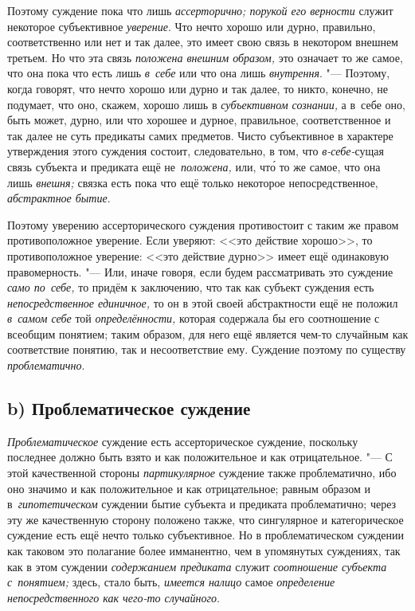 Поэтому суждение пока что лишь {\em ассерторично; порукой его верности}
служит некоторое субъективное {\em уверение}. Что нечто
хорошо или дурно, правильно, соответственно или нет и так далее, это имеет
свою связь в некотором внешнем третьем. Но что эта связь
{\em положена внешним образом,}
это означает то же самое, что она пока что есть лишь
{\em в~себе} или что она лишь {\em внутрення}. "---
Поэтому, когда говорят, что нечто хорошо или дурно и так
далее, то никто, конечно, не подумает, что оно, скажем, хорошо лишь в
{\em субъективном сознании,}
а в~себе оно, быть может, дурно, или что хорошее и дурное,
правильное, соответственное и так далее не суть предикаты самих предметов.
Чисто субъективное в характере утверждения этого суждения состоит,
следовательно, в том, что {\em в-себе-}сущая связь субъекта и предиката ещё
не~{\em положена,} или, чт\'{о} то же самое, что она лишь {\em внешня;} связка
есть пока что ещё только некоторое непосредственное, {\em абстрактное бытие}.

Поэтому уверению ассерторического суждения противостоит с таким
же правом противоположное уверение. Если уверяют: <<это действие
хорошо>>, то противоположное уверение: <<это действие дурно>> имеет ещё
одинаковую правомерность. "--- Или, иначе говоря, если будем
рассматривать это суждение {\em само по~себе,} то придём к заключению, что
так как субъект суждения есть {\em непосредственное единичное,} то он в этой
своей абстрактности ещё не положил {\em в~самом себе} той {\em определённости,}
которая содержала бы его соотношение с всеобщим понятием; таким образом,
для него ещё является чем-то случайным как соответствие понятию, так и
несоответствие ему. Суждение поэтому по существу {\em проблематично}.

\subsection[b) Проблематическое суждение]{b) Проблематическое суждение}

{\em Проблематическое} суждение есть ассерторическое суждение, поскольку
последнее должно быть взято и как положительное и как отрицательное. "---
С этой качественной стороны {\em партикулярное}
суждение также проблематично, ибо оно значимо и как
положительное и как отрицательное; равным образом и в~{\em гипотетическом}
суждении бытие субъекта и предиката проблематично; через эту
же качественную сторону положено также, что сингулярное и категорическое
суждение есть ещё нечто только субъективное. Но в проблематическом суждении
как таковом это полагание более имманентно, чем в упомянутых суждениях, так
как в этом суждении {\em содержанием предиката} служит {\em соотношение
субъекта с~понятием;} здесь, стало быть, {\em имеется налицо} самое
{\em определение непосредственного как чего-то случайного}.

